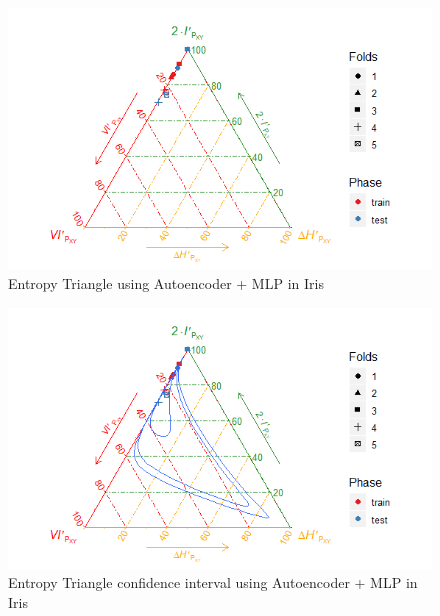 \begin{figure}[H]
	
	\includegraphics[width=\linewidth]{Figuras_tfg/ET_Iris_Auto_Mlp}
	\caption{Entropy Triangle using Autoencoder + MLP in Iris}
	\label{fig:figure_MLP_Iris_ET_Auto}
\end{figure}

\begin{figure}[H]
	
	\includegraphics[width=\linewidth]{Figuras_tfg/ET_Iris_Auto_Mlp_Confidence}
	\caption{Entropy Triangle confidence interval using Autoencoder + MLP in Iris}
	\label{fig:figure_MLP_Iris_ET_Auto_Confidence}
\end{figure}

